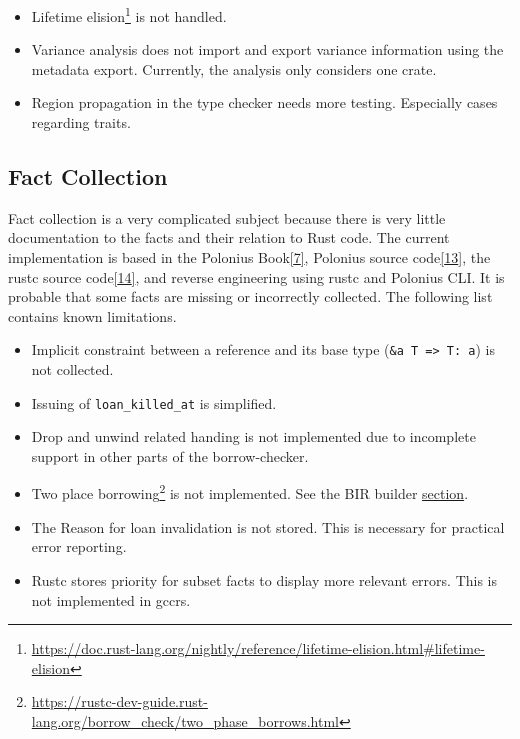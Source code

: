 \documentclass[
  11pt,
  twoside,symmetric]{report}
\providecommand{\tightlist}{%
  \setlength{\itemsep}{0pt}\setlength{\parskip}{0pt}}
\DeclareRobustCommand{\href}[2]{#2\footnote{\url{#1}}}
\begin{document}
\begin{itemize}
\tightlist
\item
  \href{https://doc.rust-lang.org/nightly/reference/lifetime-elision.html\#lifetime-elision}{Lifetime
  elision} is not handled.
\item
  Variance analysis does not import and export variance information
  using the metadata export. Currently, the analysis only considers one
  crate.
\item
  Region propagation in the type checker needs more testing. Especially
  cases regarding traits.
\end{itemize}

\hypertarget{fact-collection}{%
\subsection{Fact Collection}\label{fact-collection}}

Fact collection is a very complicated subject because there is very
little documentation to the facts and their relation to Rust code. The
current implementation is based in the Polonius
Book\protect\hyperlink{ref-polonius}{{[}7{]}}, Polonius source
code\protect\hyperlink{ref-poloniusSource}{{[}13{]}}, the rustc source
code\protect\hyperlink{ref-rustcSource}{{[}14{]}}, and reverse
engineering using rustc and Polonius CLI. It is probable that some facts
are missing or incorrectly collected. The following list contains known
limitations.

\begin{itemize}
\tightlist
\item
  Implicit constraint between a reference and its base type
  (\texttt{\&\textquotesingle{}a\ T\ =\textgreater{}\ T:\ \textquotesingle{}a})
  is not collected.
\item
  Issuing of \texttt{loan\_killed\_at} is simplified.
\item
  Drop and unwind related handing is not implemented due to incomplete
  support in other parts of the borrow-checker.
\item
  \href{https://rustc-dev-guide.rust-lang.org/borrow_check/two_phase_borrows.html}{Two
  place borrowing} is not implemented. See the BIR builder
  \protect\hyperlink{bir-and-bir-builder}{section}.
\item
  The Reason for loan invalidation is not stored. This is necessary for
  practical error reporting.
\item
  Rustc stores priority for subset facts to display more relevant
  errors. This is not implemented in gccrs.
\end{itemize}
\end{document}
